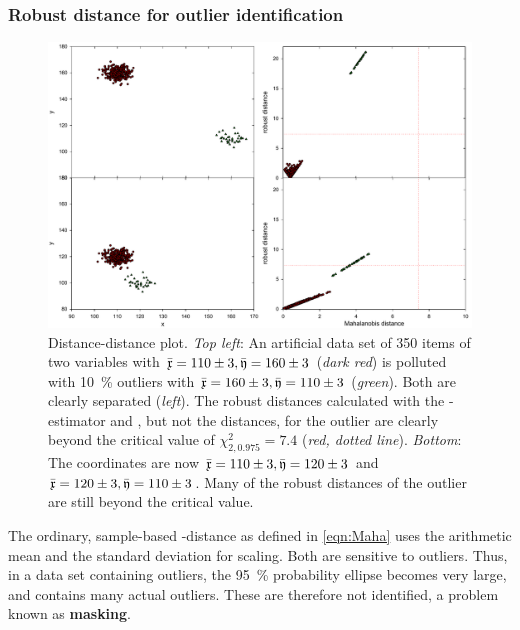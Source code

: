 \begin{refsection}
\subsubsection{Robust distance for outlier identification}

\begin{figure}
 \caption{Distance-distance plot. \emph{Top left}: An artificial data set of \num{350} items of two variables with \( \bar{\mathfrak{x}} = \num{110}\pm\num{3}, \bar{\mathfrak{y}} = \num{160}\pm\num{3} \)  (\emph{dark red}) is polluted with \SI{10}{\%} outliers with  \( \bar{\mathfrak{x}} = \num{160}\pm\num{3}, \bar{\mathfrak{y}} = \num{110}\pm\num{3} \) (\emph{green}). Both are clearly separated (\emph{left}). The robust distances calculated with the -estimator and  , but not the  distances, for the outlier are clearly beyond the critical value of \( \chi^2_{2, 0.975} = \num{7.4} \) (\emph{red, dotted line}). \emph{Bottom}: The coordinates are now \( \bar{\mathfrak{x}} = \num{110}\pm\num{3}, \bar{\mathfrak{y}} = \num{120}\pm\num{3} \) and \( \bar{\mathfrak{x}} = \num{120}\pm\num{3}, \bar{\mathfrak{y}} = \num{110}\pm\num{3} \). Many of the robust distances of the outlier are still beyond the critical value.}
 \label{fig:Dist-Dist}
 \centering
 \includegraphics[width=\textwidth]{Graphics/Distance-distance}
\end{figure}

The ordinary, sample-based -distance as defined in \ref{eqn:Maha} uses the arithmetic mean and the standard deviation for scaling. Both are sensitive to outliers. Thus, in a data set containing outliers, the \SI{95}{\%} probability ellipse becomes very large, and contains many actual outliers. These are therefore not identified, a problem known as \textbf{masking}.


\end{refsection}
